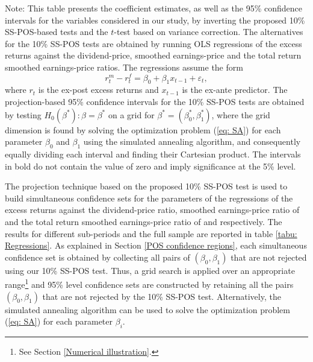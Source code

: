 \documentclass[harvard,11pt]{article}
\begin{document}
\begin{table}[hbtp!]
\begin{minipage}{\linewidth}
\vspace{1pt}
Note: This table presents the coefficient estimates, as well as the 95\% confidence intervals for the variables considered in our study, by inverting the proposed 10\% SS-POS-based tests and the $t$-test based on \citet{white1980heteroskedasticity} variance correction. The alternatives for the 10\% SS-POS tests are obtained by running OLS regressions of the excess returns against the dividend-price, smoothed earnings-price and the total return smoothed earnings-price ratios. The regressions assume the form 
\begin{equation}\label{eq: Regressions}
r_t^m-r_t^f=\beta_0+\beta_1 x_{t-1}+\varepsilon_t,
\end{equation}
where $r_t$ is the ex-post excess returns and $x_{t-1}$ is the ex-ante predictor. The projection-based 95\% confidence intervals for the 10\% SS-POS tests are obtained by testing $H_0(\beta^{*}):\beta=\beta^{*}$ on a grid for $\beta^{*}=(\beta_0^{*},\beta_1^{*})$, where the grid dimension is found by solving the optimization problem (\ref{eq: SA}) for each parameter $\beta_0$ and $\beta_1$ using the simulated annealing algorithm, and consequently equally dividing each interval and finding their Cartesian product. The intervals in bold do not contain the value of zero and imply significance at the 5\% level.
\end{minipage}
\end{table}


The projection technique based on the proposed 10\% SS-POS test is used to build simultaneous confidence sets for the parameters of the regressions of the excess returns against the
dividend-price ratio, smoothed earnings-price ratio of \citet{campbell1988dividend} and the total return smoothed earnings-price ratio of \citet{bunn2014cape} and \citet{jivraj2017many} respectively. The results for different sub-periods and the full sample are reported in table \ref{tabu: Regressions}. As explained in Section \ref{POS confidence regions}, each simultaneous confidence set is obtained by
collecting all pairs of $(\beta_0 ,\beta_1 )$ that are not rejected using our 10\% SS-POS test. Thus, a grid search is applied over an appropriate range\footnote{See Section \ref{Numerical illustration}.} and 95\% level confidence sets are constructed by retaining all the pairs $(\beta_0 ,\beta_1 )$ that are not
rejected by the 10\% SS-POS test. Alternatively, the simulated annealing algorithm can be used to solve the optimization problem (\ref{eq: SA}) for each parameter $\beta_i$. 
\end{document}
